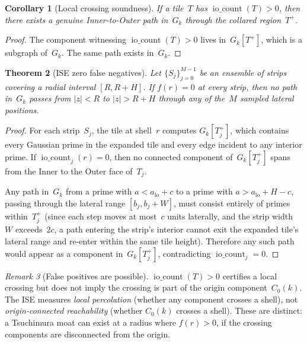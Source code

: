 \documentclass[11pt,a4paper]{article}
\newcommand{\Gk}{G_k}
\newcommand{\fr}{f(r)}
\newcommand{\iocount}{\operatorname{io\_count}}
\newcommand{\Tplus}{T^+}
\theoremstyle{definition}
\theoremstyle{plain}
\newtheorem{theorem}{Theorem}[section]
\newtheorem{corollary}[theorem]{Corollary}
\theoremstyle{remark}
\newtheorem{remark}[theorem]{Remark}
\begin{document}
\begin{corollary}[Local crossing soundness]\label{cor:local-crossing}
If a tile~$T$ has $\iocount(T) > 0$, then there exists a genuine Inner-to-Outer path in~$\Gk$ through the collared region~$\Tplus$.
\end{corollary}

\begin{proof}
The component witnessing $\iocount(T) > 0$ lives in~$\Gk[\Tplus]$, which is a subgraph of~$\Gk$.  The same path exists in~$\Gk$.
\end{proof}

\begin{theorem}[ISE zero false negatives]\label{thm:ise-zero-fn}
Let $\{S_j\}_{j=0}^{M-1}$ be an ensemble of strips covering a radial interval $[R, R+H]$.  If $\fr = 0$ at every strip, then no path in~$\Gk$ passes from $|z| < R$ to $|z| > R + H$ through any of the~$M$ sampled lateral positions.
\end{theorem}

\begin{proof}
For each strip~$S_j$, the tile at shell~$r$ computes $\Gk[\Tplus_j]$, which contains every Gaussian prime in the expanded tile and every edge incident to any interior prime.  If $\iocount_j(r) = 0$, then no connected component of~$\Gk[\Tplus_j]$ spans from the Inner to the Outer face of~$T_j$.

Any path in~$\Gk$ from a prime with $a < a_{\text{lo}} + c$ to a prime with $a > a_{\text{lo}} + H - c$, passing through the lateral range $[b_j, b_j + W]$, must consist entirely of primes within~$\Tplus_j$ (since each step moves at most~$c$ units laterally, and the strip width~$W$ exceeds~$2c$, a path entering the strip's interior cannot exit the expanded tile's lateral range and re-enter within the same tile height).  Therefore any such path would appear as a component in~$\Gk[\Tplus_j]$, contradicting $\iocount_j = 0$.
\end{proof}

\begin{remark}[False positives are possible]\label{rem:false-positives}
$\iocount(T) > 0$ certifies a local crossing but does not imply the crossing is part of the origin component~$C_0(k)$.  The ISE measures \emph{local percolation} (whether any component crosses a shell), not \emph{origin-connected reachability} (whether $C_0(k)$ crosses a shell).  These are distinct: a Tsuchimura moat can exist at a radius where $\fr > 0$, if the crossing components are disconnected from the origin.
\end{remark}
\end{document}
